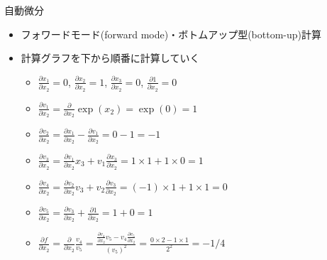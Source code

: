 \begin{frame}[t,fragile]{自動微分}
  \begin{itemize}
  \item フォワードモード(forward mode)・ボトムアップ型(bottom-up)計算
  \item 計算グラフを下から順番に計算していく
    \begin{itemize}
    \item $\displaystyle \frac{\partial x_1}{\partial x_2} = 0$,
      $\displaystyle \frac{\partial x_2}{\partial x_2} = 1$,
      $\displaystyle \frac{\partial x_3}{\partial x_2} = 0$,
      $\displaystyle \frac{\partial 1}{\partial x_2} = 0$
    \item $\displaystyle \frac{\partial v_1}{\partial x_2} = \frac{\partial}{\partial x_2} \exp(x_2) = \exp(0) = 1$
    \item $\displaystyle \frac{\partial v_2}{\partial x_2} = \frac{\partial x_1}{\partial x_2} - \frac{\partial v_1}{\partial x_2} = 0-1 = -1$
    \item $\displaystyle \frac{\partial v_3}{\partial x_2} = \frac{\partial v_1}{\partial x_2} x_3 +  v_1 \frac{\partial x_3}{\partial x_2} = 1 \times 1 + 1 \times 0 = 1$
    \item $\displaystyle \frac{\partial v_4}{\partial x_2} = \frac{\partial v_2}{\partial x_2} v_3 +  v_2  \frac{\partial v_3}{\partial x_2} = (-1) \times 1 + 1 \times 1 = 0$
    \item $\displaystyle \frac{\partial v_5}{\partial x_2} = \frac{\partial v_3}{\partial x_2} +   \frac{\partial 1}{\partial x_2} = 1 + 0 = 1$
    \item $\displaystyle \frac{\partial f}{\partial x_2} = \frac{\partial}{\partial x_2} \frac{v_4}{v_5} = \frac{\frac{\partial v_4}{\partial x_2} v_5 - v_4 \frac{\partial v_5}{\partial x_2}}{(v_5)^2} = \frac{0 \times 2 - 1 \times 1}{2^2} = -1/4$
    \end{itemize}

\end{itemize}
\end{frame}

